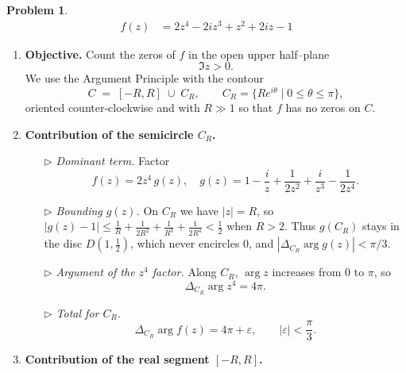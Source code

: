 \documentclass[12pt]{article}
\theoremstyle{definition} %
\newtheorem{problem}{Problem}
\theoremstyle{plain} %
\begin{document}
\begin{problem}
    \begin{align}
        f(z) &= 2z^{4}-2iz^{3}+z^{2}+2iz-1
    \end{align}

    \begin{enumerate}
    \item \textbf{Objective.}  
          Count the zeros of $f$ in the open upper half–plane  
          $$\Im z>0.$$
          We use the Argument Principle with the contour
          \[
              C \;=\;[-R,R]\;\cup\;C_{R},
              \qquad
              C_{R}=\{Re^{i\theta}\mid0\le\theta\le\pi\},
          \]
          oriented counter‑clockwise and with $R\gg1$ so that $f$ has no zeros
          on $C$.

    \item \textbf{Contribution of the semicircle $C_{R}$.}

          \begin{enumerate}
          \item[$\triangleright$] \emph{Dominant term.}  
                Factor
                \[
                    f(z)=2z^{4}\,g(z),
                    \quad
                    g(z)=1-\frac{i}{z}+\frac{1}{2z^{2}}+\frac{i}{z^{3}}
                          -\frac{1}{2z^{4}}.
                \]
          \item[$\triangleright$] \emph{Bounding $g(z)$.}  
                On $C_{R}$ we have $|z|=R$, so
                \(
                    |g(z)-1|\le\frac1R+\frac{1}{2R^{2}}+\frac1{R^{3}}
                             +\frac{1}{2R^{4}}
                           <\frac12
                \)
                when $R>2$.  Thus $g(C_{R})$ stays in the disc
                $D(1,\tfrac12)$, which never encircles $0$, and
                $|\Delta_{C_{R}}\arg g(z)|<\pi/3$.
          \item[$\triangleright$] \emph{Argument of the $z^{4}$ factor.}  
                Along $C_{R}$, $\arg z$ increases from $0$ to $\pi$, so
                \[
                    \Delta_{C_{R}}\arg z^{4}=4\pi.
                \]
          \item[$\triangleright$] \emph{Total for $C_{R}$.}  
                \[
                    \Delta_{C_{R}}\arg f(z)
                    = 4\pi + \varepsilon,
                    \qquad |\varepsilon|<\frac{\pi}{3}.
                \]
          \end{enumerate}

    \item \textbf{Contribution of the real segment $[-R,R]$.}


\end{enumerate}
\end{problem}
\end{document}
